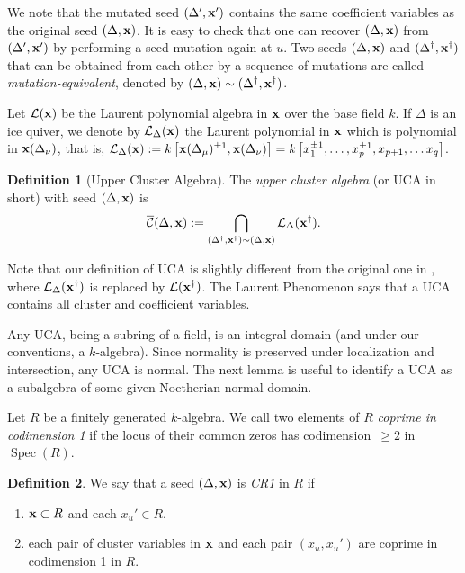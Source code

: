 \documentclass{amsart}
\newtheorem{theorem}{Theorem}[section]
\theoremstyle{definition}
\newtheorem{definition}[theorem]{Definition}
\theoremstyle{remark}
\numberwithin{equation}{section}
\newcommand{\mc}[1]{\mathcal{#1}}
\renewcommand{\b}[1]{\bold{#1}}
\newcommand{\br}[1]{\overline{#1}}
\newcommand{\uca}{\br{\mc{C}}}
\begin{document}
\noindent We note that the mutated seed $(\Delta',\b{x}')$ contains the same
coefficient variables as the original seed $(\Delta,\b{x})$.
It is easy to check that one can recover $(\Delta,\b{x})$
from $(\Delta',\b{x}')$ by performing a seed mutation again at $u$.
Two seeds $(\Delta,\b{x})$ and $(\Delta^\dag,\b{x}^\dag)$ that can be obtained from each other by a sequence of mutations are called {\em mutation-equivalent}, denoted by $(\Delta,\b{x})\sim (\Delta^\dag,\b{x}^\dag)$.

Let $\mc{L}(\b{x})$ be the Laurent polynomial algebra in $\b{x}$ over the base field $k$.
If $\Delta$ is an ice quiver, we denote by $\mc{L}_{\Delta}(\b{x})$ the Laurent polynomial in $\b{x}$ which is polynomial in $\b{x}(\Delta_{\nu})$,
that is, $\mc{L}_\Delta(\b{x}):=k\left[\b{x}(\Delta_\mu)^{\pm1},\b{x}(\Delta_\nu)\right]=k\left[x_1^{\pm 1},\dots,x_p^{\pm 1}, x_{p+1}, \dots x_{q}\right]$.


\begin{definition}[{Upper Cluster Algebra}]
	The {\em upper cluster algebra} (or UCA in short) with seed $(\Delta,\b{x})$ is
	$$\uca(\Delta,\b{x}):=\bigcap_{(\Delta^\dag,\b{x}^\dag) \sim (\Delta,\b{x})}\mc{L}_{\Delta}(\b{x}^\dag).$$
\end{definition}
\noindent Note that our definition of UCA is slightly different from the original one in \cite{BFZ}, where $\mc{L}_\Delta(\b{x}^\dag)$ is replaced by $\mc{L}(\b{x}^\dag)$.
The Laurent Phenomenon \cite{FZ1,BFZ} says that a UCA contains all cluster and coefficient variables.


Any UCA, being a subring of a field, is an integral domain (and under our conventions, a $k$-algebra).
Since normality is preserved under localization and intersection, any UCA is normal.
The next lemma is useful to identify a UCA as a subalgebra of some given Noetherian normal domain.

Let $R$ be a finitely generated $k$-algebra.
We call two elements of $R$ {\em coprime in codimension 1} if the locus of their common zeros
has codimension~$\ge 2$ in $\operatorname{Spec}(R)$. %
\begin{definition}  \label{D:CR1} We say that a seed $(\Delta,\b{x})$ is {\em CR1} in $R$ if 
	\begin{enumerate} \item $\b{x}\subset R$ and each $x_u'\in R$.
		\item	each pair of cluster variables in $\b{x}$ and each pair $(x_u,x_u')$ are coprime in codimension 1 in $R$.
	\end{enumerate}
\end{definition}
\end{document}

